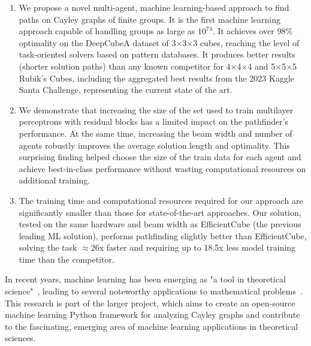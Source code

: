 \begin{enumerate}
    \item We propose a novel multi-agent, machine learning-based approach to find paths on Cayley graphs of finite groups. It is the first machine learning approach capable of handling groups as large as $ {10}^{74}$. It achieves over 98\% optimality on the DeepCubeA dataset of 3$\times$3$\times$3 cubes, reaching the level of task-oriented solvers based on pattern databases. It produces better results (shorter solution paths) than any known competitor for 4$\times$4$\times$4 and 5$\times$5$\times$5 Rubik's Cubes, including the aggregated best results from the 2023 Kaggle Santa Challenge, representing the current state of the art.
    \item We demonstrate that increasing the size of the set used to train multilayer perceptrons with residual blocks has a limited impact on the pathfinder's performance. At the same time, increasing the beam width and number of agents robustly improves the average solution length and optimality. This surprising finding helped choose the size of the train data for each agent and achieve best-in-class performance without wasting computational resources on additional training.
    \item The training time and computational resources required for our approach are significantly smaller than those for state-of-the-art approaches. Our solution, tested on the same hardware and beam width as EfficientCube (the previous leading ML solution), performs pathfinding slightly better than EfficientCube, solving the task $\approx26$x faster and requiring up to 18.5x less model training time than the competitor.
\end{enumerate}


In recent years, machine learning has been emerging as "a tool in theoretical science"~\cite{douglas2022machine}, leading to several noteworthy applications to mathematical problems~\cite{lample2019deep,davies2021advancing, bao2021polytopes, romera2024mathematical, coates2024machine,alfarano2024global, charton2024patternboost,shehper2024makes}. This research is part of the larger project, which aims to create an open-source machine learning Python framework for analyzing Cayley graphs and contribute to the fascinating, emerging area of machine learning applications in theoretical sciences.

